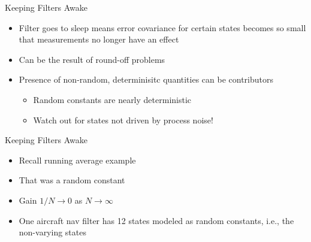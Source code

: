 \begin{frame}
Keeping Filters Awake
 \begin{itemize}
 \item Filter goes to sleep means error covariance for certain states becomes so small that measurements no longer have an effect
 \item Can be the result of round-off problems
 \item Presence of non-random, determinisitc quantities can be contributors
	\begin{itemize}
		\item Random constants are nearly deterministic
		\item Watch out for states not driven by process noise!
	\end{itemize}
\end{itemize}
\end{frame}

\begin{frame}
Keeping Filters Awake
\begin{itemize}
  \item Recall running average example
  \item That was a random constant
  \item Gain $1/N\rightarrow 0$ as $N\rightarrow\infty$
  \item One aircraft nav filter has 12 states modeled as random constants, i.e., the non-varying states
\end{itemize} 
\end{frame}


